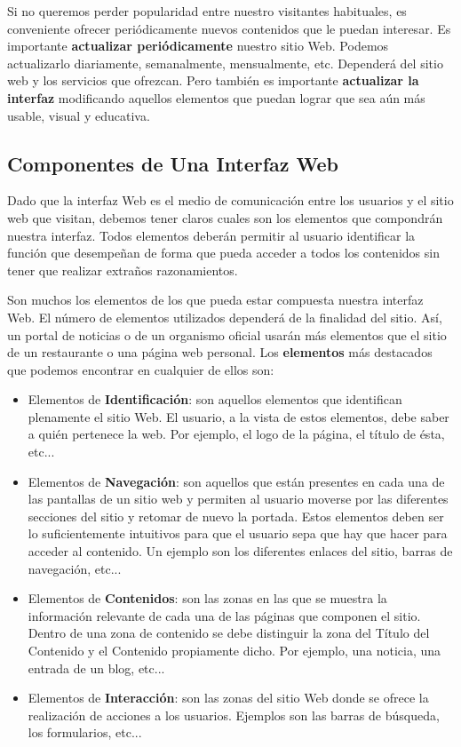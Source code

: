 Si no queremos perder popularidad entre nuestro visitantes habituales, es conveniente ofrecer periódicamente nuevos contenidos que le puedan interesar. Es importante \textbf{actualizar periódicamente} nuestro sitio Web. Podemos actualizarlo diariamente, semanalmente, mensualmente, etc. Dependerá del sitio web y los servicios que ofrezcan. Pero también es importante \textbf{actualizar la interfaz} modificando aquellos elementos que puedan lograr que sea aún más usable, visual y educativa.

\subsection{Componentes de Una Interfaz Web}
Dado que la interfaz Web es el medio de comunicación entre los usuarios y el sitio web que visitan, debemos tener claros cuales son los elementos que compondrán nuestra interfaz. Todos elementos deberán permitir al usuario identificar la función que desempeñan de forma que pueda acceder a todos los contenidos sin tener que realizar extraños razonamientos.

Son muchos los elementos de los que pueda estar compuesta nuestra interfaz Web. El número de elementos utilizados dependerá de la finalidad del sitio. Así, un portal de noticias o de un organismo oficial usarán más elementos que el sitio de un restaurante o una página web personal. Los \textbf{elementos} más destacados que podemos encontrar en cualquier de ellos son:

\begin{itemize}
    \item Elementos de \textbf{Identificación}: son aquellos elementos que identifican plenamente el sitio Web. El usuario, a la vista de estos elementos, debe saber a quién pertenece la web. Por ejemplo, el logo de la página, el título de ésta, etc...
    \item Elementos de \textbf{Navegación}: son aquellos que están presentes en cada una de las pantallas de un sitio web y permiten al usuario moverse por las diferentes secciones del sitio y retomar de nuevo la portada. Estos elementos deben ser lo suficientemente intuitivos para que el usuario sepa que hay que hacer para acceder al contenido. Un ejemplo son los diferentes enlaces del sitio, barras de navegación, etc...
    \item Elementos de \textbf{Contenidos}: son las zonas en las que se muestra la información relevante de cada una de las páginas que componen el sitio. Dentro de una zona de contenido se debe distinguir la zona del Título del Contenido y el Contenido propiamente dicho. Por ejemplo, una noticia, una entrada de un blog, etc...
    \item Elementos de \textbf{Interacción}: son las zonas del sitio Web donde se ofrece la realización de acciones a los usuarios. Ejemplos son las barras de búsqueda, los formularios, etc...
\end{itemize}

